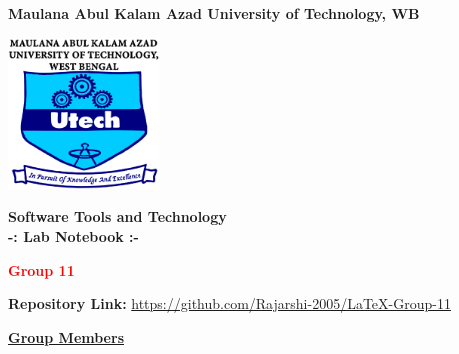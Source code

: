 \documentclass[a4paper,12pt]{article}
\begin{document}
\begin{titlepage}
    \centering
    \vspace*{0 cm}
    \Large
    \textbf{Maulana Abul Kalam Azad University of Technology, WB}
    \vspace{0.5cm}
    
    \includegraphics[width=0.3\textwidth]{makaut1.png} %
    \vspace{0.5cm}
    
    \LARGE
    \textbf{\textcolor{blue!60}{Software Tools and Technology\\
        -: Lab Notebook :-}}
    \vspace{0.5cm}
    
    \large
    \textbf{\textcolor{red}{Group 11}}
    \vspace{1 cm}
    
    \textbf{Repository Link:} \href{https://github.com/Rajarshi-2005/LaTeX-Group-11}{https://github.com/Rajarshi-2005/LaTeX-Group-11}
    \vspace{1cm}
    
    \textbf{\underline{\textcolor{blue!60}{Group Members}}}
    \vspace{0.5cm}


\end{titlepage}
\end{document}
